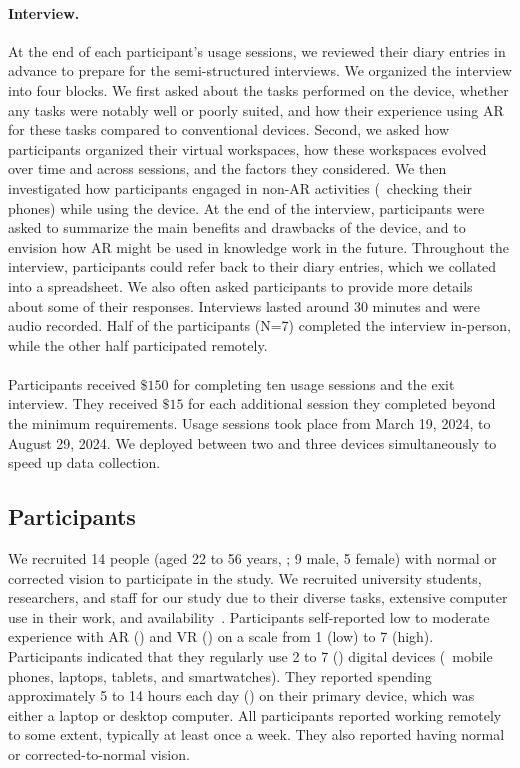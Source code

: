 \paragraph{Interview.}
At the end of each participant's usage sessions, 
we reviewed their diary entries in advance to prepare for the semi-structured interviews.
We organized the interview into four blocks.
We first asked about the tasks performed on the device, whether any tasks were notably well or poorly suited, and how their experience using AR for these tasks compared to conventional devices.
Second, we asked how participants organized their virtual workspaces, how these workspaces evolved over time and across sessions, and the factors they considered.
We then investigated how participants engaged in non-AR activities (\eg~checking their phones) while using the device.
At the end of the interview, participants were asked to summarize the main benefits and drawbacks of the device, and to envision how AR might be used in knowledge work in the future.
Throughout the interview, participants could refer back to their diary entries, which we collated into a spreadsheet.
We also often asked participants to provide more details about some of their responses.
Interviews lasted around 30 minutes and were audio recorded. 
Half of the participants (N=7) completed the interview in-person, while the other half participated remotely.

\paragraph{}
Participants received $\$150$
for completing ten usage sessions and the exit interview.
They received $\$15$ for each additional session they completed beyond the minimum requirements.
Usage sessions took place from March 19, 2024, to August 29, 2024.
We deployed between two and three devices simultaneously to speed up data collection.


\subsection{Participants}
We recruited 14 people (aged 22 to 56 years, ; 9 male, 5 female) with normal or corrected vision to participate in the study. 
We recruited university students, researchers, and staff for our study due to their diverse tasks, extensive computer use in their work, and availability~\cite{babaei2020facesoffocus}.
Participants self-reported low to moderate experience with AR () and VR () on a scale from 1 (low) to 7 (high).
Participants indicated that they regularly use 2 to 7 () digital devices (\ie~mobile phones, laptops, tablets, and smartwatches).
They reported spending approximately 5 to 14 hours each day () on their primary device, which was either a laptop or desktop computer.
All participants reported working remotely to some extent, typically at least once a week.
They also reported having normal or corrected-to-normal vision.


